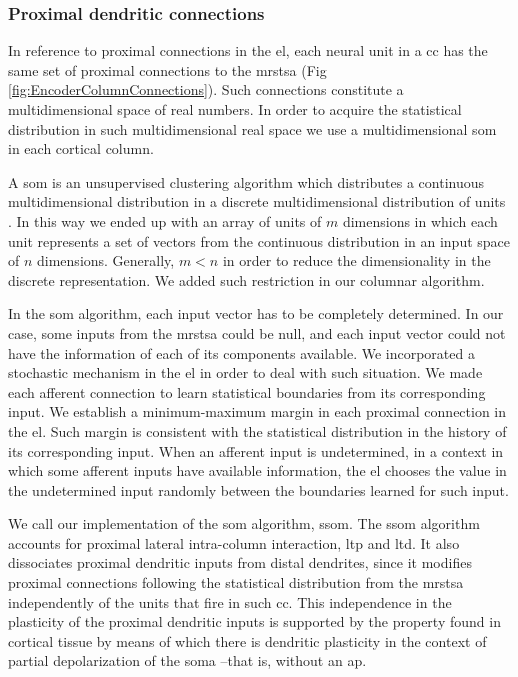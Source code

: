 \documentclass[10pt,letterpaper]{article}
\begin{document}
\pagebreak

\subsubsection*{Proximal dendritic connections}

In reference to proximal connections in the \gls{el}, each neural unit in a \gls{cc} has the same set of
proximal connections to the \gls{mrstsa} (Fig \ref{fig:EncoderColumnConnections}).
Such connections constitute a multidimensional space of real numbers.
In order to acquire the statistical distribution in such multidimensional real space we use
a multidimensional \gls{som} in each cortical column.

A \gls{som} is an unsupervised clustering algorithm which distributes a continuous multidimensional distribution
in a discrete multidimensional distribution of units \cite{Kohonen:1989:SAM:69371, kohonen_2082}.
In this way we ended up with an array of units of $m$ dimensions in which each unit
represents a set of vectors from the continuous distribution in an input space of $n$ dimensions.
Generally, $m < n$ in order to reduce the dimensionality in the discrete representation.
We added such restriction in our columnar algorithm.

In the \gls{som} algorithm, each input vector has to be completely determined.
In our case, some inputs from the \gls{mrstsa} could be null,
and each input vector could not have the information of each of its components available.
We incorporated a stochastic mechanism in the \gls{el} in order to deal with such situation.
We made each afferent connection to learn statistical boundaries from its corresponding input.
We establish a minimum-maximum margin in each proximal connection in the \gls{el}.
Such margin is consistent with the statistical distribution in the history of its corresponding input.
When an afferent input is undetermined, in a context in which some afferent inputs have
available information,
the \gls{el} chooses
the value in the undetermined input
randomly
between the boundaries learned for such input.

We call our implementation of the \gls{som} algorithm, \gls{ssom}.
The \gls{ssom} algorithm accounts for proximal lateral intra-column interaction, \gls{ltp} and
\gls{ltd}.
It also dissociates proximal dendritic inputs from distal dendrites, since
it modifies
proximal connections
following the statistical distribution from the
\gls{mrstsa} independently of the units that fire in such \gls{cc}.
This independence in the plasticity of the proximal dendritic inputs
is supported by
the
property
found in cortical tissue by means of which there is dendritic plasticity
in the context of partial depolarization of the soma \cite{reiter_1998}--that is, without an \gls{ap}. %
\end{document}
